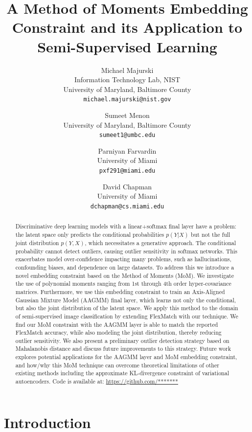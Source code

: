 \documentclass[10pt,twocolumn,letterpaper]{article}
\title{A Method of Moments Embedding Constraint and its Application to Semi-Supervised Learning}
\author{Michael Majurski\\
	Information Technology Lab, NIST\\
	University of Maryland, Baltimore County\\
	{\tt\small michael.majurski@nist.gov}
\and
Sumeet Menon\\
University of Maryland, Baltimore County\\
{\tt\small sumeet1@umbc.edu}
\and
Parniyan Farvardin\\
University of Miami\\
{\tt\small pxf291@miami.edu}
\and
David Chapman\\
University of Miami\\
{\tt\small dchapman@cs.miami.edu}
}
\begin{document}
\maketitle


\begin{abstract}
	Discriminative deep learning models with a linear+softmax final layer have a problem: the latent space only predicts the conditional probabilities $p(Y|X)$ but not the full joint distribution $p(Y,X)$, which necessitates a generative approach.
	The conditional probability cannot detect outliers, causing outlier sensitivity in softmax networks.
	This exacerbates model over-confidence impacting many problems, such as hallucinations, confounding biases, and dependence on large datasets.
	To address this we introduce a novel embedding constraint based on the Method of Moments (MoM).
	We investigate the use of polynomial moments ranging from 1st through 4th order hyper-covariance matrices.
	Furthermore, we use this embedding constraint to train an Axis-Aligned Gaussian Mixture Model (AAGMM) final layer, which learns not only the conditional, but also the joint distribution of the latent space.
	We apply this method to the domain of semi-supervised image classification by extending FlexMatch with our technique.
	We find our MoM constraint with the AAGMM layer is able to match the reported FlexMatch accuracy, while also modeling the joint distribution, thereby reducing outlier sensitivity.  We also present a preliminary outlier detection strategy based on Mahalanobis distance and discuss future improvements to this strategy.  Future work explores potential applications for the AAGMM layer and MoM embedding constraint, and how/why this MoM technique can overcome theoretical limitations of other existing methods including the approximate KL-divergence constraint of variational autoencoders.
	Code is available at: \url{https://github.com/*******} %
\end{abstract}


\section{Introduction}
\end{document}
